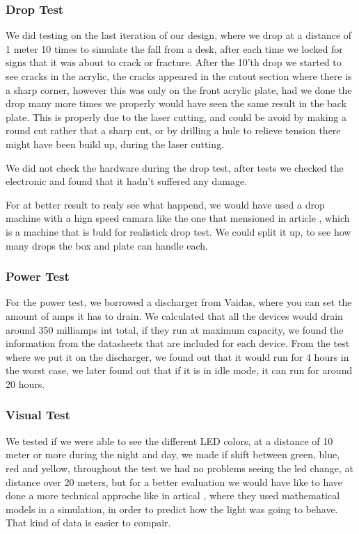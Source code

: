 \subsubsection{Drop Test}
We did testing on the last iteration of our design, where we drop at a distance of 1 meter 10 times to simulate the fall from a desk, after each time we locked for signs that it was about to crack or fracture.
After the 10'th drop we started to see cracks in the acrylic, the cracks appeared in the cutout section where there is a sharp corner, however this was only on the front acrylic plate, had we done the drop many more times we properly would have seen the same result in the back plate.
This is properly due to the laser cutting, and could be avoid by making a round cut rather that a sharp cut, or by drilling a hule to relieve tension there might have been build up, during the laser cutting.

We did not check the hardware during the drop test, after tests we checked the electronic and found that it hadn't suffered any damage.

For at better result to realy see what happend, we would have used a drop machine with a hign speed camara like the one that mensioned in article \cite{DropTest}, which is a machine that is buld for realistick drop test.
We could split it up, to see how many drops the box and plate can handle each.

\subsubsection{Power Test}
For the power test, we borrowed a discharger from Vaidas, where you can set the amount of amps it has to drain.
We calculated that all the devices would drain around 350 milliamps int total, if they run at maximum capacity, we found the information from the datasheets that are included for each device.
From the test where we put it on the discharger, we found out that it would run for 4 hours in the worst case, we later found out that if it is in idle mode, it can run for around 20 hours.

\subsubsection{Visual Test}
We tested if we were able to see the different LED colors, at a distance of 10 meter or more during the night and day, we made if shift between green, blue, red and yellow, throughout the test we had no problems seeing the led change, at distance over 20 meters, but for a better evaluation we would have like to have done a more technical approche like in artical \cite{LEDLIGHT}, where they used mathematical models in a simulation, in order to predict how the light was going to behave. That kind of data is easier to compair.

